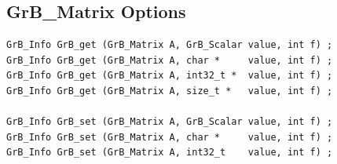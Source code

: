 
\newpage
\subsection{{\sf GrB\_Matrix} Options}
\label{get_set_matrix}

\begin{mdframed}[userdefinedwidth=6in]
{\footnotesize
\begin{verbatim}
GrB_Info GrB_get (GrB_Matrix A, GrB_Scalar value, int f) ;
GrB_Info GrB_get (GrB_Matrix A, char *     value, int f) ;
GrB_Info GrB_get (GrB_Matrix A, int32_t *  value, int f) ;
GrB_Info GrB_get (GrB_Matrix A, size_t *   value, int f) ;

GrB_Info GrB_set (GrB_Matrix A, GrB_Scalar value, int f) ;
GrB_Info GrB_set (GrB_Matrix A, char *     value, int f) ;
GrB_Info GrB_set (GrB_Matrix A, int32_t    value, int f) ;
\end{verbatim}
}\end{mdframed}

